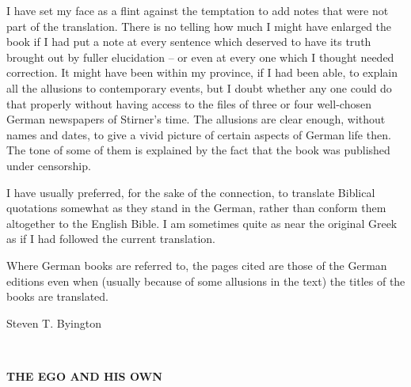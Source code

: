 I have set my face as a flint against the temptation to add notes that were 
not part of the translation. There is no telling how much I might have 
enlarged the book if I had put a note at every sentence which deserved to have 
its truth brought out by fuller elucidation -- or even at every one which I 
thought needed correction. It might have been within my province, if I had 
been able, to explain all the allusions to contemporary events, but I doubt 
whether any one could do that properly without having access to the files of 
three or four well-chosen German newspapers of Stirner's time. The allusions 
are clear enough, without names and dates, to give a vivid picture of certain 
aspects of German life then. The tone of some of them is explained by the fact 
that the book was published under censorship.

I have usually preferred, for the sake of the connection, to translate 
Biblical quotations somewhat as they stand in the German, rather than conform 
them altogether to the English Bible. I am sometimes quite as near the 
original Greek as if I had followed the current translation.

Where German books are referred to, the pages cited are those of the German 
editions even when (usually because of some allusions in the text) the titles 
of the books are translated.

\begin{flushright}
Steven T. Byington\end{flushright}


\newpage{}

~

\vspace{200pt}

\begin{center}
\textbf{THE EGO AND HIS OWN}
\end{center}


